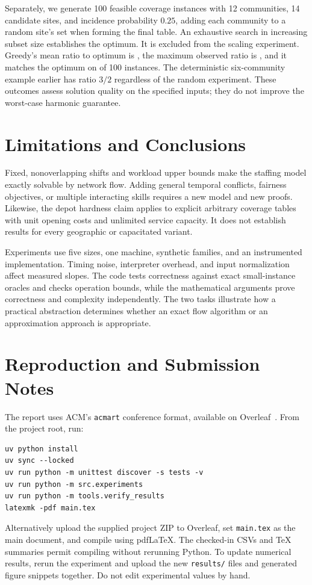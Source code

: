 \documentclass[sigconf,nonacm]{acmart}
\begin{document}
Separately, we generate 100 feasible coverage instances with 12 communities,
14 candidate sites, and incidence probability $0.25$, adding each community
to a random site's set when forming the final table. An exhaustive search
in increasing subset size establishes the optimum. It is excluded from the
scaling experiment. Greedy's mean ratio to optimum is
\QualityMeanRatio{}, the maximum observed ratio is \QualityMaxRatio{}, and
it matches the optimum on \QualityOptimalCount{} of 100 instances.
The deterministic six-community example earlier has ratio $3/2$ regardless
of the random experiment. These outcomes assess solution quality on the
specified inputs; they do not improve the worst-case harmonic guarantee.

\section{Limitations and Conclusions}
Fixed, nonoverlapping shifts and workload upper bounds make the staffing
model exactly solvable by network flow. Adding general temporal conflicts,
fairness objectives, or multiple interacting skills requires a new model and
new proofs. Likewise, the depot hardness claim applies to explicit arbitrary
coverage tables with unit opening costs and unlimited service capacity.
It does not establish results for every geographic or capacitated variant.

Experiments use five sizes, one machine, synthetic families, and an
instrumented implementation. Timing noise, interpreter overhead, and
input normalization affect measured slopes. The code tests correctness
against exact small-instance oracles and checks operation bounds, while
the mathematical arguments prove correctness and complexity independently.
The two tasks illustrate how a practical abstraction determines whether an
exact flow algorithm or an approximation approach is appropriate.




\clearpage
\onecolumn
\appendix
\lstset{basicstyle=\ttfamily\footnotesize}
\section{Reproduction and Submission Notes}
The report uses ACM's \texttt{acmart} conference format, available on
Overleaf~\cite{template}. From the project root, run:
\begin{Verbatim}[fontsize=\small,breaklines=true]
uv python install
uv sync --locked
uv run python -m unittest discover -s tests -v
uv run python -m src.experiments
uv run python -m tools.verify_results
latexmk -pdf main.tex
\end{Verbatim}
Alternatively upload the supplied project ZIP to Overleaf, set
\texttt{main.tex} as the main document, and compile using pdfLaTeX.
The checked-in CSVs and TeX summaries permit compiling without rerunning
Python. To update numerical results, rerun the experiment and upload the new
\texttt{results/} files and generated figure snippets together. Do not edit
experimental values by hand.
\end{document}
